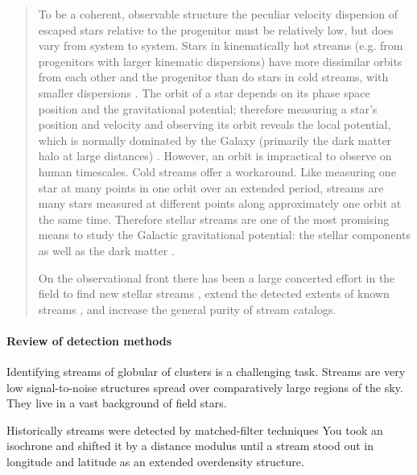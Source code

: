 \documentclass[twocolumn]{aastex631}
\newcommand{\stream}[1]{#1}
\begin{document}
\begin{quotation}
        To be a coherent, observable structure the peculiar velocity dispersion of
        escaped stars relative to the progenitor must be relatively low, but does vary
        from system to system. Stars in kinematically hot streams (e.g. from
        progenitors with larger kinematic dispersions) have more dissimilar orbits
        from each other and the progenitor than do stars in cold streams, with smaller
        dispersions \citep{Johnston1998, Hendel2015}. The orbit of a star depends on
        its phase space position and the gravitational potential; therefore measuring
        a star's position and velocity and observing its orbit reveals the local
        potential, which is normally dominated by the Galaxy (primarily the dark
        matter halo at large distances) \citep{Gibbons2014}. However, an orbit is
        impractical to observe on human timescales. Cold streams offer a workaround.
        Like measuring one star at many points in one orbit over an extended period,
        streams are many stars measured at different points along approximately one
        orbit at the same time. Therefore stellar streams are one of the most
        promising means to study the Galactic gravitational potential: the stellar
        components as well as the dark matter \citep{Johnston2016}.

        On the observational front there has been a large concerted effort in the
        field to find new stellar streams \citep[for an extensive list of known
        Galactic streams see][]{Mateu2022}, extend the detected extents of known
        streams \citep[e.g. for \stream{Palomar 5} alone:][]{Rockosi2002, Ibata2017,
        Grillmair2006, Carlberg2012, StarkmanEtAl2019}, and increase the general
        purity of stream catalogs.

    \end{quotation}


    \paragraph{Review of detection methods}

        Identifying streams of globular of clusters is a challenging task. Streams are very low signal-to-noise structures spread over comparatively large regions of the sky. They live in a vast background of field stars.

        Historically streams were detected by matched-filter techniques
        You took an isochrone and shifted it by a distance modulus until a stream stood out in longitude and latitude as an extended overdensity structure.
\end{document}
